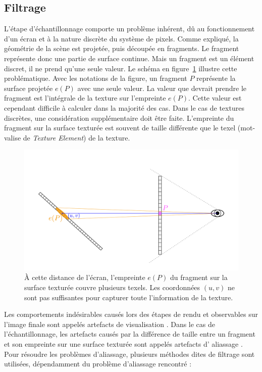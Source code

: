 \subsection*{Filtrage}
\label{subsec:filtering}

L'étape d'échantillonnage comporte un problème inhérent, dû au fonctionnement d'un écran et à la nature discrète du système de pixels. Comme expliqué, la géométrie de la scène est projetée, puis découpée en fragments. Le fragment représente donc une partie de surface continue. Mais un fragment est un élément discret, il ne prend qu'une seule valeur. Le schéma en figure~\ref{fig:aliasing} illustre cette problématique. Avec les notations de la figure, un fragment $P$ représente la surface projetée $e(P)$ avec une seule valeur. La valeur que devrait prendre le fragment est l'intégrale de la texture sur l'empreinte $e(P)$. Cette valeur est cependant difficile à calculer dans la majorité des cas. Dans le cas de textures discrètes, une considération supplémentaire doit être faite. L'empreinte du fragment sur la surface texturée est souvent de taille différente que le texel (mot-valise de \textit{Texture Element}) de la texture.

\bigskip

\begin{figure}
    \centering
    \includegraphics[width=\textwidth]{contenu/resources/images/schema_filtrage}
    \caption[Visualisation du problème d'échantillonnage lors du rendu par rastérisation]{À cette distance de l'écran, l'empreinte $e(P)$ du fragment sur la surface texturée couvre plusieurs texels. Les coordonnées $(u, v)$ ne sont pas suffisantes pour capturer toute l'information de la texture.}
    \label{fig:aliasing}
\end{figure}

Les comportements indésirables causés lors des étapes de rendu et observables sur l'image finale sont appelés \og artefacts de visualisation \fg. Dans le cas de l'échantillonnage, les artefacts causés par la différence de taille entre un fragment et son empreinte sur une surface texturée sont appelés artefacts d' \og aliassage \fg. Pour résoudre les problèmes d'aliassage, plusieurs méthodes dites de \og filtrage \fg sont utilisées, dépendamment du problème d'aliassage rencontré :

